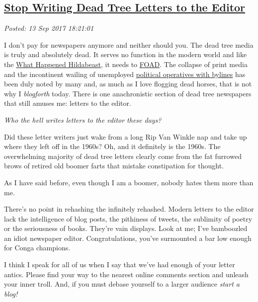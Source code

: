 %

\subsection*{\href{https://analyzethedatanotthedrivel.org/2017/09/13/stop-writing-dead-tree-letters-to-the-editor/}{Stop Writing Dead Tree Letters to the Editor}}


\noindent\emph{Posted: 13 Sep 2017 18:21:01}
\vspace{6pt}

I don't pay for newspapers anymore and neither should you. The dead tree
media is truly and absolutely dead. It serves no function in the modern
world and like the
\href{https://www.youtube.com/watch?v=yzDHHMWDC_k}{What Happened
Hildabeast}, it needs to
\href{https://www.acronymfinder.com/FOAD.html}{FOAD}. The collapse of
print media and the incontinent wailing of unemployed
\href{http://smallestminority.blogspot.com/2015/07/quote-of-day-democratic-operatives-with.html}{political
operatives with bylines} has been duly noted by many and, as much as I
love flogging dead horses, that is not why I \emph{blogforth} today.
There is one anachronistic section of dead tree newspapers that still
amuses me: letters to the editor.

\emph{Who the hell writes letters to the editor these days?}

Did these letter writers just wake from a long Rip Van Winkle nap and
take up where they left off in the 1960s? Oh, and it definitely is the
1960s. The overwhelming majority of dead tree letters clearly come from
the fat furrowed brows of retired old boomer farts that mistake
constipation for thought.

As I have said before, even though I am a boomer, nobody hates them more
than me.

There's no point in rehashing the infinitely rehashed. Modern letters to
the editor lack the intelligence of blog posts, the pithiness of tweets,
the sublimity of poetry or the seriousness of books. They're vain
displays. Look at me; I've bamboozled an idiot newspaper editor.
Congratulations, you've surmounted a bar low enough for Conga champions.

I think I speak for all of us when I say that we've had enough of your
letter antics. Please find your way to the nearest online comments
section and unleash your inner troll. And, if you must debase yourself
to a larger audience \emph{start a blog!}



%

